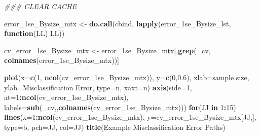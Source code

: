 \documentclass[
]{book}
\newenvironment{Shaded}{\begin{snugshade}}{\end{snugshade}}
\newcommand{\CommentTok}[1]{\textcolor[rgb]{0.56,0.35,0.01}{\textit{#1}}}
\newcommand{\ControlFlowTok}[1]{\textcolor[rgb]{0.13,0.29,0.53}{\textbf{#1}}}
\newcommand{\DataTypeTok}[1]{\textcolor[rgb]{0.13,0.29,0.53}{#1}}
\newcommand{\DecValTok}[1]{\textcolor[rgb]{0.00,0.00,0.81}{#1}}
\newcommand{\FloatTok}[1]{\textcolor[rgb]{0.00,0.00,0.81}{#1}}
\newcommand{\KeywordTok}[1]{\textcolor[rgb]{0.13,0.29,0.53}{\textbf{#1}}}
\newcommand{\NormalTok}[1]{#1}
\newcommand{\OperatorTok}[1]{\textcolor[rgb]{0.81,0.36,0.00}{\textbf{#1}}}
\newcommand{\StringTok}[1]{\textcolor[rgb]{0.31,0.60,0.02}{#1}}
\begin{document}
\begin{Shaded}
\begin{Highlighting}[]
\CommentTok{\#\#\# CLEAR CACHE}

\NormalTok{error\_1se\_Bysize\_mtx <{-}}\StringTok{ }\KeywordTok{do.call}\NormalTok{(}\StringTok{\textquotesingle{}cbind\textquotesingle{}}\NormalTok{, }\KeywordTok{lapply}\NormalTok{(error\_1se\_Bysize\_lst, }\ControlFlowTok{function}\NormalTok{(LL) LL))}

\NormalTok{cv\_error\_1se\_Bysize\_mtx <{-}}\StringTok{ }\NormalTok{error\_1se\_Bysize\_mtx[,}\KeywordTok{grep}\NormalTok{(}\StringTok{\textquotesingle{}\_cv\textquotesingle{}}\NormalTok{, }\KeywordTok{colnames}\NormalTok{(error\_1se\_Bysize\_mtx))]}

\KeywordTok{plot}\NormalTok{(}\DataTypeTok{x=}\KeywordTok{c}\NormalTok{(}\DecValTok{1}\NormalTok{, }\KeywordTok{ncol}\NormalTok{(cv\_error\_1se\_Bysize\_mtx)), }\DataTypeTok{y=}\KeywordTok{c}\NormalTok{(}\DecValTok{0}\NormalTok{,}\FloatTok{0.6}\NormalTok{), }
  \DataTypeTok{xlab=}\StringTok{\textquotesingle{}sample size\textquotesingle{}}\NormalTok{, }\DataTypeTok{ylab=}\StringTok{\textquotesingle{}Misclassification Error\textquotesingle{}}\NormalTok{, }
  \DataTypeTok{type=}\StringTok{\textquotesingle{}n\textquotesingle{}}\NormalTok{, }\DataTypeTok{xaxt=}\StringTok{\textquotesingle{}n\textquotesingle{}}\NormalTok{)}
\KeywordTok{axis}\NormalTok{(}\DataTypeTok{side=}\DecValTok{1}\NormalTok{, }\DataTypeTok{at=}\DecValTok{1}\OperatorTok{:}\KeywordTok{ncol}\NormalTok{(cv\_error\_1se\_Bysize\_mtx), }
 \DataTypeTok{labels=}\KeywordTok{sub}\NormalTok{(}\StringTok{\textquotesingle{}\_cv\textquotesingle{}}\NormalTok{,}\StringTok{\textquotesingle{}\textquotesingle{}}\NormalTok{,}\KeywordTok{colnames}\NormalTok{(cv\_error\_1se\_Bysize\_mtx)))}
\ControlFlowTok{for}\NormalTok{(JJ }\ControlFlowTok{in} \DecValTok{1}\OperatorTok{:}\DecValTok{15}\NormalTok{)}
\KeywordTok{lines}\NormalTok{(}\DataTypeTok{x=}\DecValTok{1}\OperatorTok{:}\KeywordTok{ncol}\NormalTok{(cv\_error\_1se\_Bysize\_mtx), }\DataTypeTok{y=}\NormalTok{cv\_error\_1se\_Bysize\_mtx[JJ,],}
 \DataTypeTok{type=}\StringTok{\textquotesingle{}b\textquotesingle{}}\NormalTok{, }\DataTypeTok{pch=}\NormalTok{JJ, }\DataTypeTok{col=}\NormalTok{JJ)}
\KeywordTok{title}\NormalTok{(}\StringTok{\textquotesingle{}Example Misclassification Error Paths\textquotesingle{}}\NormalTok{)}
\end{Highlighting}
\end{Shaded}
\end{document}
